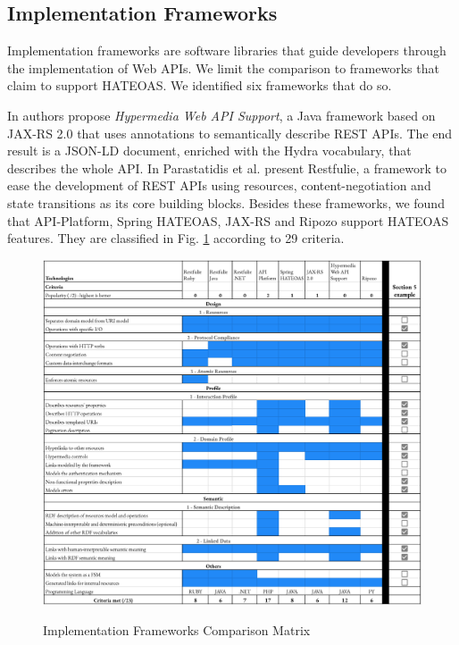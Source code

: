 \subsection{Implementation Frameworks}

Implementation frameworks are software libraries that guide developers through the implementation of Web APIs. We limit the comparison to frameworks that claim to support HATEOAS. We identified six frameworks that do so.

In \cite{salvadori2014framework} authors propose \textit{Hypermedia Web API Support}, a Java framework based on JAX-RS 2.0 that uses annotations to semantically describe REST APIs. The end result is a JSON-LD document, enriched with the Hydra vocabulary, that describes the whole API. In \cite{parastatidis2010role} Parastatidis et al. present Restfulie, a framework to ease the development of REST APIs using resources, content-negotiation and state transitions as its core building blocks. Besides these frameworks, we found that API-Platform, Spring HATEOAS, JAX-RS and Ripozo support HATEOAS features. They are classified in Fig. \ref{frameworks-matrix} according to 29 criteria. %

\begin{figure}[Ht]
\caption{Implementation Frameworks Comparison Matrix}
\includegraphics[width=1\textwidth]{figures/frameworks.png}
\label{frameworks-matrix}
\end{figure}

